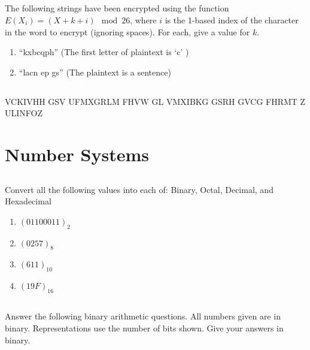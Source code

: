 \documentclass[twocolumn]{article}
\begin{document}
\subsection{}

    The following strings have been encrypted using the function $E(X_i) = (X + k + i) \mod 26$, where $i$ is the 1-based index of the character in the word to encrypt (ignoring spaces). For each, give a value for $k$.

    \begin{enumerate}
        \item ``kxbcqph'' (The first letter of plaintext is `c' )
        \item ``lacn ep gs'' (The plaintext is a sentence)
    \end{enumerate}

\subsection{}

VCKIVHH GSV UFMXGRLM FHVW GL VMXIBKG GSRH GVCG FHRMT Z ULINFOZ

\clearpage
\section{Number Systems}

\subsection{}

    Convert all the following values into each of: Binary, Octal, Decimal, and Hexadecimal

    \begin{enumerate}
        \item $ ( 01100011 )_2 $
        \item $ ( 0257)_8 $
        \item $ ( 611 )_{10} $
        \item $ ( 19F )_{16} $
    \end{enumerate}

\subsection{}

    Answer the following binary arithmetic questions. All numbers given are in binary. Representations use the number of bits shown. Give your answers in binary.
\end{document}
